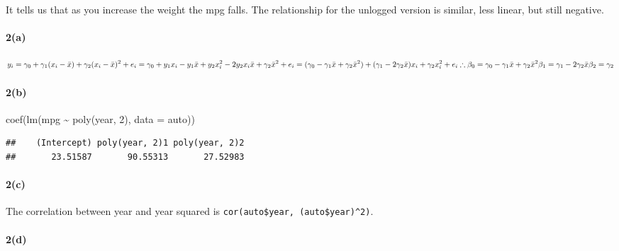 \documentclass[
]{article}
\newenvironment{Shaded}{\begin{snugshade}}{\end{snugshade}}
\newcommand{\AttributeTok}[1]{\textcolor[rgb]{0.77,0.63,0.00}{#1}}
\newcommand{\DecValTok}[1]{\textcolor[rgb]{0.00,0.00,0.81}{#1}}
\newcommand{\FunctionTok}[1]{\textcolor[rgb]{0.00,0.00,0.00}{#1}}
\newcommand{\NormalTok}[1]{#1}
\newcommand{\SpecialCharTok}[1]{\textcolor[rgb]{0.00,0.00,0.00}{#1}}
\begin{document}
It tells us that as you increase the weight the mpg falls. The
relationship for the unlogged version is similar, less linear, but still
negative.

\hypertarget{a-1}{%
\paragraph{2(a)}\label{a-1}}

\[
y_i = \gamma_0 + \gamma_1(x_i-\bar{x}) + \gamma_2(x_i-\bar{x})^2 + e_i = 
\\
\gamma_0 + y_1x_i - y_1\bar{x} + y_2x_i^2 - 2y_2x_i\bar{x} + \gamma_2\bar{x}^2 + e_i = 
\\
(\gamma_0 - \gamma_1\bar{x} + \gamma_2\bar{x}^2) + (\gamma_1 - 2\gamma_2\bar{x})x_i + \gamma_2x_i^2 + e_i 
\\
\therefore \beta_0 = \gamma_0 - \gamma_1\bar{x} + \gamma_2\bar{x}^2
\\
\beta_1 = \gamma_1 - 2\gamma_2\bar{x}
\\
\beta_2 = \gamma_2
\]

\hypertarget{b-1}{%
\paragraph{2(b)}\label{b-1}}

\begin{Shaded}
\begin{Highlighting}[]
\FunctionTok{coef}\NormalTok{(}\FunctionTok{lm}\NormalTok{(mpg }\SpecialCharTok{\textasciitilde{}} \FunctionTok{poly}\NormalTok{(year, }\DecValTok{2}\NormalTok{), }\AttributeTok{data =}\NormalTok{ auto))}
\end{Highlighting}
\end{Shaded}

\begin{verbatim}
##    (Intercept) poly(year, 2)1 poly(year, 2)2 
##       23.51587       90.55313       27.52983
\end{verbatim}

\hypertarget{c-1}{%
\paragraph{2(c)}\label{c-1}}

The correlation between year and year squared is
\texttt{cor(auto\$year,\ (auto\$year)\^{}2)}.

\hypertarget{d-1}{%
\paragraph{2(d)}\label{d-1}}
\end{document}
